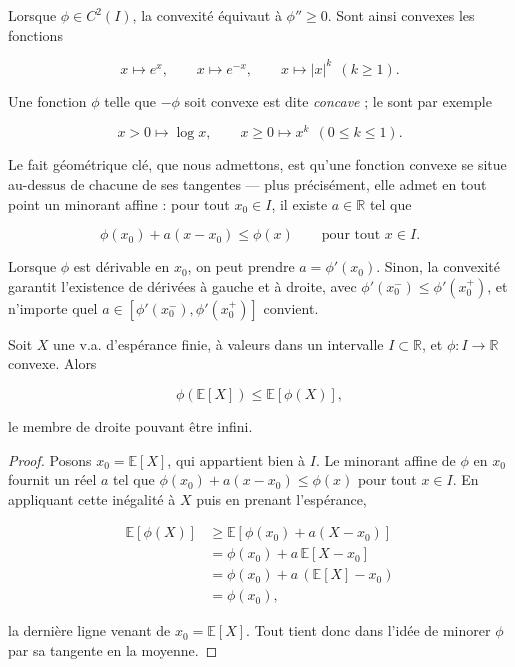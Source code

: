 Lorsque $\phi \in C^2(I)$, la convexité équivaut à $\phi'' \geq 0$. Sont ainsi convexes les fonctions

$$
x \mapsto e^x, \qquad x \mapsto e^{-x}, \qquad x \mapsto |x|^k \ \ (k \geq 1).
$$

Une fonction $\phi$ telle que $-\phi$ soit convexe est dite \emph{concave} ; le sont par exemple

$$
x > 0 \mapsto \log x, \qquad x \geq 0 \mapsto x^k \ \ (0 \leq k \leq 1).
$$

Le fait géométrique clé, que nous admettons, est qu'une fonction convexe se situe au-dessus de chacune de ses tangentes — plus précisément, elle admet en tout point un minorant affine : pour tout $x_0 \in I$, il existe $a \in \mathbb{R}$ tel que

$$
\phi(x_0) + a(x - x_0) \leq \phi(x) \qquad \text{pour tout } x \in I.
$$

Lorsque $\phi$ est dérivable en $x_0$, on peut prendre $a = \phi'(x_0)$. Sinon, la convexité garantit l'existence de dérivées à gauche et à droite, avec $\phi'(x_0^-) \leq \phi'(x_0^+)$, et n'importe quel $a \in [\phi'(x_0^-), \phi'(x_0^+)]$ convient.

\medskip

\begin{mdframed}
\begin{theoreme}
Soit $X$ une v.a. d'espérance finie, à valeurs dans un intervalle $I \subset \mathbb{R}$, et $\phi : I \to \mathbb{R}$ convexe. Alors

$$
\phi(\mathbb{E}[X]) \leq \mathbb{E}[\phi(X)],
$$

le membre de droite pouvant être infini.
\end{theoreme}
\end{mdframed}

\begin{proof}
Posons $x_0 = \mathbb{E}[X]$, qui appartient bien à $I$. Le minorant affine de $\phi$ en $x_0$ fournit un réel $a$ tel que $\phi(x_0) + a(x - x_0) \leq \phi(x)$ pour tout $x \in I$. En appliquant cette inégalité à $X$ puis en prenant l'espérance,

\begin{align*}
\mathbb{E}[\phi(X)] &\geq \mathbb{E}[\phi(x_0) + a(X - x_0)] \\
&= \phi(x_0) + a\, \mathbb{E}[X - x_0] \\
&= \phi(x_0) + a\, (\mathbb{E}[X] - x_0) \\
&= \phi(x_0),
\end{align*}

la dernière ligne venant de $x_0 = \mathbb{E}[X]$. Tout tient donc dans l'idée de minorer $\phi$ par sa tangente en la moyenne.
\end{proof}

